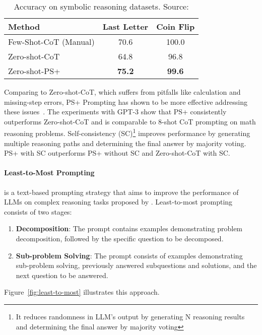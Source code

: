 \begin{table}[h!]
	\centering
	\begin{tabularx}{\textwidth}{Xcc}
		\hline
		\textbf{Method}       & \textbf{Last Letter} & \textbf{Coin Flip} \\ \hline
		Few-Shot-CoT (Manual) & 70.6                 & 100.0              \\
		Zero-shot-CoT         & 64.8                 & 96.8               \\
		Zero-shot-PS+         & \textbf{75.2}        & \textbf{99.6}      \\ \hline
	\end{tabularx}
	\caption{Accuracy on symbolic reasoning datasets. Source: \textcite{wang2023plan}}
	\label{tab:symbolic-reasoning}
\end{table}

Comparing to Zero-shot-CoT, which suffers from pitfalls like calculation and missing-step errors, PS+ Prompting has shown to be more effective addressing these issues~\cite{wang2023plan}.
The experiments with GPT-3 show that PS+ consistently outperforms Zero-shot-CoT and is comparable to 8-shot CoT prompting on math reasoning problems.
Self-consistency (SC)\footnote{It reduces randomness in LLM’s output by generating N reasoning results and determining the final answer by majority voting}\cite{wang2022self} improves performance by generating multiple reasoning paths and determining the final answer by majority voting.
PS+ with SC outperforms PS+ without SC and Zero-shot-CoT with SC\@.

\paragraph{Least-to-Most Prompting}
\label{par:least-to-most}

is a text-based prompting strategy that aims to improve the performance of LLMs on complex reasoning tasks proposed by \textcite{zhou2022least}.
Least-to-most prompting consists of two stages:
\begin{enumerate}
	\item \textbf{Decomposition}: The prompt contains examples demonstrating problem decomposition, followed by the specific question to be decomposed.
	\item \textbf{Sub-problem Solving}: The prompt consists of examples demonstrating sub-problem solving, previously answered subquestions and solutions, and the next question to be answered.
\end{enumerate}
Figure~\ref{fig:least-to-most} illustrates this approach.

